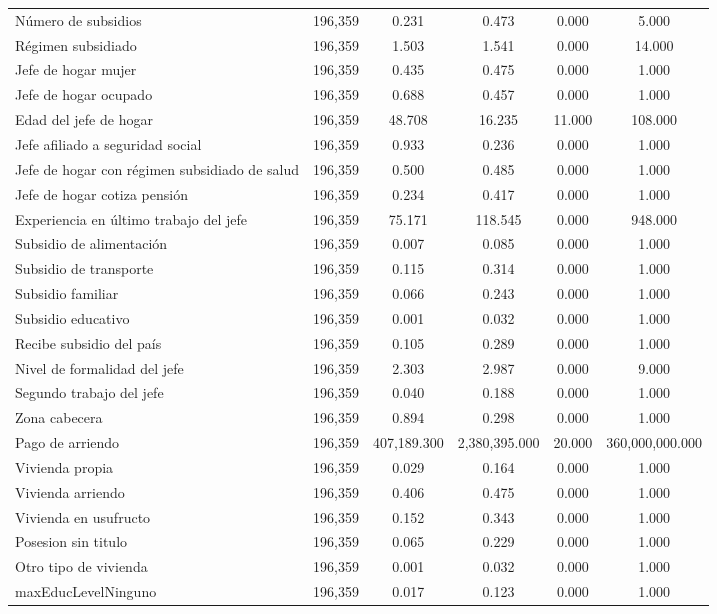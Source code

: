 \begin{table}[!htbp]
\begin{tabular}{@{\extracolsep{5pt}}lccccc}
Número de subsidios & 196,359 & 0.231 & 0.473 & 0.000 & 5.000 \\ 
Régimen subsidiado & 196,359 & 1.503 & 1.541 & 0.000 & 14.000 \\ 
Jefe de hogar mujer & 196,359 & 0.435 & 0.475 & 0.000 & 1.000 \\ 
Jefe de hogar ocupado & 196,359 & 0.688 & 0.457 & 0.000 & 1.000 \\ 
Edad del jefe de hogar & 196,359 & 48.708 & 16.235 & 11.000 & 108.000 \\ 
Jefe afiliado a seguridad social & 196,359 & 0.933 & 0.236 & 0.000 & 1.000 \\ 
Jefe de hogar con régimen subsidiado de salud & 196,359 & 0.500 & 0.485 & 0.000 & 1.000 \\ 
Jefe de hogar cotiza pensión & 196,359 & 0.234 & 0.417 & 0.000 & 1.000 \\ 
Experiencia en último trabajo del jefe & 196,359 & 75.171 & 118.545 & 0.000 & 948.000 \\ 
Subsidio de alimentación & 196,359 & 0.007 & 0.085 & 0.000 & 1.000 \\ 
Subsidio de transporte & 196,359 & 0.115 & 0.314 & 0.000 & 1.000 \\ 
Subsidio familiar & 196,359 & 0.066 & 0.243 & 0.000 & 1.000 \\ 
Subsidio educativo & 196,359 & 0.001 & 0.032 & 0.000 & 1.000 \\ 
Recibe subsidio del país & 196,359 & 0.105 & 0.289 & 0.000 & 1.000 \\ 
Nivel de formalidad del jefe & 196,359 & 2.303 & 2.987 & 0.000 & 9.000 \\ 
Segundo trabajo del jefe & 196,359 & 0.040 & 0.188 & 0.000 & 1.000 \\ 
Zona cabecera & 196,359 & 0.894 & 0.298 & 0.000 & 1.000 \\ 
Pago de arriendo & 196,359 & 407,189.300 & 2,380,395.000 & 20.000 & 360,000,000.000 \\ 
Vivienda propia & 196,359 & 0.029 & 0.164 & 0.000 & 1.000 \\ 
Vivienda arriendo & 196,359 & 0.406 & 0.475 & 0.000 & 1.000 \\ 
Vivienda en usufructo & 196,359 & 0.152 & 0.343 & 0.000 & 1.000 \\ 
Posesion sin titulo & 196,359 & 0.065 & 0.229 & 0.000 & 1.000 \\ 
Otro tipo de vivienda & 196,359 & 0.001 & 0.032 & 0.000 & 1.000 \\ 
maxEducLevelNinguno & 196,359 & 0.017 & 0.123 & 0.000 & 1.000 \\ 

\end{tabular}
\end{table}
